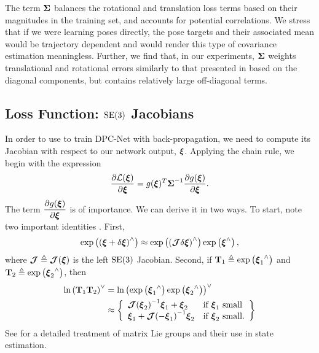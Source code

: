 The term $\boldsymbol{\mathbf{\Sigma}}$ balances the rotational and translation loss terms based on their magnitudes in the training set, and accounts for potential correlations. We stress that if we were learning poses directly, the pose targets and their associated mean would be trajectory dependent and would render this type of covariance estimation meaningless. Further, we find that, in our experiments, $\boldsymbol{\mathbf{\Sigma}}$ weights translational and rotational errors similarly to that presented in \cite{Kendall2017-ix} %
 based on the diagonal components, but contains relatively large off-diagonal terms.

\subsection{Loss Function: $\mathrm{SE}(3)$ Jacobians}
In order to use  to train DPC-Net with back-propagation, we need to compute its Jacobian with respect to our network output, $\boldsymbol{\mathbf{\xi}}$. Applying the chain rule, we begin with the expression
\begin{equation}
	\label{eq:se3_jacobchainrule}
	\dfrac{\partial \mathcal{L} (\boldsymbol{\mathbf{\xi}}) }{\partial  \boldsymbol{\mathbf{\xi}}} =  g({\boldsymbol{\mathbf{\xi}}})^T {\boldsymbol{\mathbf{\Sigma}}}^{-1} \dfrac{\partial g({\boldsymbol{\mathbf{\xi}}})}{\partial \boldsymbol{\mathbf{\xi}}}.
\end{equation}
The term $\dfrac{\partial g({\boldsymbol{\mathbf{\xi}}})}{\partial \boldsymbol{\mathbf{\xi}}}$ is of importance. We can derive it in two ways. To start, note two important identities \cite{Barfoot2017-ri}. First,
\begin{equation}
	\label{eq:delta_xi_exp}
\text{exp}\left({( \boldsymbol{\mathbf{\xi}} + \delta \boldsymbol{\mathbf{\xi}})}^{\wedge}\right) \approx \text{exp}\left({(\boldsymbol{\mathbf{\mathcal{J}}} \delta \boldsymbol{\mathbf{\xi}})}^{\wedge}\right) \text{exp}\left({\boldsymbol{\mathbf{\xi}}}^{\wedge}\right),
\end{equation}
where $\boldsymbol{\mathbf{\mathcal{J}}} \triangleq \boldsymbol{\mathbf{\mathcal{J}}}(\boldsymbol{\mathbf{\xi}})$ is the left $\mathrm{SE}(3)$ Jacobian.
Second, if $\boldsymbol{\mathbf{T}}_1 \triangleq \text{exp}\left({\boldsymbol{\mathbf{\xi}}_1}^{\wedge}\right)$ and $\boldsymbol{\mathbf{T}}_2 \triangleq \text{exp}\left({\boldsymbol{\mathbf{\xi}}_2}^{\wedge}\right)$, then
\begin{align}
	\label{eq:jacobian_xi_small}
\text{ln}\left({\boldsymbol{\mathbf{T}}_1 \boldsymbol{\mathbf{T}}_2} \right)^{\vee} &= \text{ln}\left({ \text{exp}\left({\boldsymbol{\mathbf{\xi}}_1}^{\wedge}\right) \text{exp}\left({\boldsymbol{\mathbf{\xi}}_2}^{\wedge}\right) } \right)^{\vee} \nonumber \\
								  &\approx \left\{
	\begin{array}{ll}
		{  \boldsymbol{\mathbf{\mathcal{J}}}  (  \boldsymbol{\mathbf{\xi}}  _2)}^{-1} \boldsymbol{\mathbf{\xi}}_1 + \boldsymbol{\mathbf{\xi}}_2   & \mbox{if } \boldsymbol{\mathbf{\xi}}_1 ~ \mbox{small} \\
		\boldsymbol{\mathbf{\xi}}_1 + {\boldsymbol{\mathbf{\mathcal{J}}}(-\boldsymbol{\mathbf{\xi}}_1)}^{-1} \boldsymbol{\mathbf{\xi}}_2 & \mbox{if } \boldsymbol{\mathbf{\xi}}_2 ~ \mbox{small}.
	\end{array}
\right\}
\end{align}
See \cite{Barfoot2017-ri} for a detailed treatment of matrix Lie groups and their use in state estimation.
